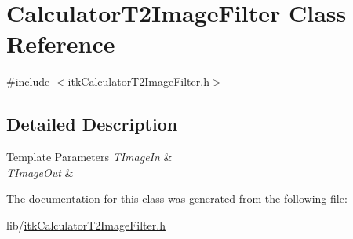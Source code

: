 \hypertarget{class_calculator_t2_image_filter}{\section{Calculator\-T2\-Image\-Filter Class Reference}
\label{class_calculator_t2_image_filter}
}


{\ttfamily \#include $<$itk\-Calculator\-T2\-Image\-Filter.\-h$>$}



\subsection{Detailed Description}

\begin{DoxyTemplParams}{Template Parameters}
{\em T\-Image\-In} & \\
\hline
{\em T\-Image\-Out} & \\
\hline
\end{DoxyTemplParams}


The documentation for this class was generated from the following file\-:\begin{DoxyCompactItemize}
\item 
lib/\hyperlink{itk_calculator_t2_image_filter_8h}{itk\-Calculator\-T2\-Image\-Filter.\-h}\end{DoxyCompactItemize}
